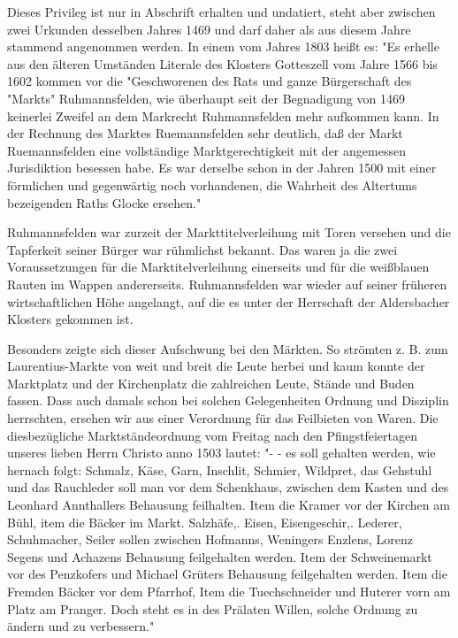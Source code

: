 Dieses Privileg ist nur in Abschrift erhalten und undatiert, steht aber zwischen
zwei Urkunden desselben Jahres 1469 und darf daher als aus diesem Jahre stammend
angenommen werden. In einem vom Jahres 1803 heißt es: "Es erhelle aus den
älteren Umständen Literale des Klosters Gotteszell vom Jahre 1566 bis 1602
kommen vor die "Geschworenen des Rats und ganze Bürgerschaft des "Markts"
Ruhmannsfelden, wie überhaupt seit der Begnadigung von 1469 keinerlei Zweifel an
dem Markrecht Ruhmannsfelden mehr aufkommen kann. In der Rechnung des Marktes
Ruemannsfelden sehr deutlich, daß der Markt Ruemannsfelden eine vollständige
Marktgerechtigkeit mit der angemessen Jurisdiktion besessen habe. Es war
derselbe schon in der Jahren 1500 mit einer förmlichen und gegenwärtig noch
vorhandenen, die Wahrheit des Altertums bezeigenden Raths Glocke ersehen."

Ruhmannsfelden war zurzeit der Markttitelverleihung mit Toren versehen und die
Tapferkeit seiner Bürger war rühmlichst bekannt. Das waren ja die zwei
Voraussetzungen für die Marktitelverleihung einerseits und für die weißblauen
Rauten im Wappen andererseits. Ruhmannsfelden war wieder auf seiner früheren
wirtschaftlichen Höhe angelangt, auf die es unter der Herrschaft der
Aldersbacher Klosters gekommen ist.

Besonders zeigte sich dieser Aufschwung bei den Märkten. So strömten z. B. zum
Laurentius-Markte von weit und breit die Leute herbei und kaum konnte der
Marktplatz und der Kirchenplatz die zahlreichen Leute, Stände und Buden fassen.
Dass auch damals schon bei solchen Gelegenheiten Ordnung und Disziplin
herrschten, ersehen wir aus einer Verordnung für das Feilbieten von Waren. Die
diesbezügliche Marktständeordnung vom Freitag nach den Pfingstfeiertagen unseres
lieben Herrn Christo anno 1503 lautet: "- - es soll gehalten werden, wie hernach
folgt: Schmalz, Käse, Garn, Inschlit, Schmier, Wildpret, das Gehstuhl und das
Rauchleder soll man vor dem Schenkhaus, zwischen dem Kasten und des Leonhard
Annthallers Behausung feilhalten. Item die Kramer vor der Kirchen am Bühl, item
die Bäcker im Markt. Salzhäfe,. Eisen, Eisengeschir,. Lederer, Schuhmacher,
Seiler sollen zwischen Hofmanns, Weningers Enzlens, Lorenz Segens und Achazens
Behausung feilgehalten werden. Item der Schweinemarkt vor des Penzkofers und
Michael Grüters Behausung feilgehalten werden. Item die Fremden Bäcker vor dem
Pfarrhof, Item die Tuechschneider und Huterer vorn am Platz am Pranger. Doch
steht es in des Prälaten Willen, solche Ordnung zu ändern und zu verbessern."


